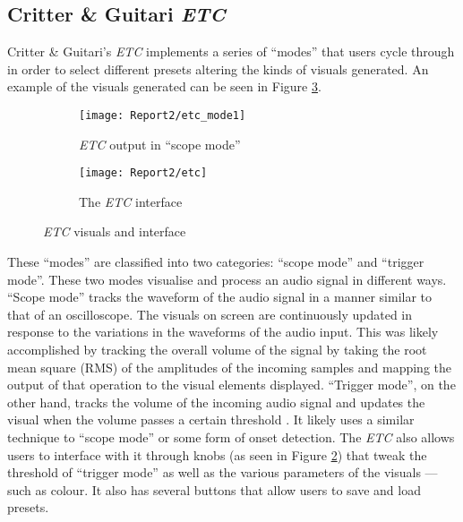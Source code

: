 \documentclass[../../initial_thesis.tex]{subfiles}
\begin{document}
\subsection{Critter \& Guitari \textit{ETC}}
Critter \& Guitari's \textit{ETC} implements a series of ``modes'' that users cycle through in order to select different presets altering the kinds of visuals generated. An example of the visuals generated can be seen in Figure \ref{fig:etc1}.

\begin{figure}[h]
  \begin{subfigure}{0.5\textwidth}
  \texttt{[image: Report2/etc\_mode1]}
  \caption{\textit{ETC} output in ``scope mode''}
  \label{fig:etc_mode1}
\end{subfigure}
\begin{subfigure}{0.5\textwidth}
  \texttt{[image: Report2/etc]}
  \caption{The \textit{ETC} interface}
  \label{fig:etc_interface}
\end{subfigure}
\caption{\textit{ETC} visuals and interface}
\label{fig:etc1}
\end{figure}

These ``modes'' are classified into two categories: ``scope mode'' and ``trigger mode''. These two modes visualise and process an audio signal in different ways. ``Scope mode'' tracks the waveform of the audio signal in a manner similar to that of an oscilloscope. The visuals on screen are continuously updated in response to the variations in the waveforms of the audio input. This was likely accomplished by tracking the overall volume of the signal by taking the root mean square (RMS) of the amplitudes of the incoming samples and mapping the output of that operation to the visual elements displayed. ``Trigger mode'', on the other hand, tracks the volume of the incoming audio signal and updates the visual when the volume passes a certain threshold \cite{ETCmanual}. It likely uses a similar technique to ``scope mode'' or some form of onset detection. The \textit{ETC} also allows users to interface with it through knobs (as seen in Figure \ref{fig:etc_interface}) that tweak the threshold of ``trigger mode'' as well as the various parameters of the visuals --- such as colour. It also has several buttons that allow users to save and load presets. \par
\end{document}
